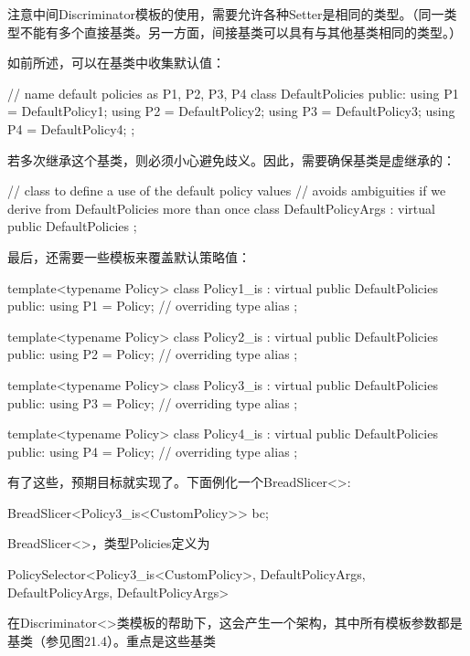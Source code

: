 注意中间Discriminator模板的使用，需要允许各种Setter是相同的类型。（同一类型不能有多个直接基类。另一方面，间接基类可以具有与其他基类相同的类型。）

如前所述，可以在基类中收集默认值：

\begin{cpp}
// name default policies as P1, P2, P3, P4
class DefaultPolicies {
	public:
	using P1 = DefaultPolicy1;
	using P2 = DefaultPolicy2;
	using P3 = DefaultPolicy3;
	using P4 = DefaultPolicy4;
};
\end{cpp}

若多次继承这个基类，则必须小心避免歧义。因此，需要确保基类是虚继承的：

\begin{cpp}
// class to define a use of the default policy values
// avoids ambiguities if we derive from DefaultPolicies more than once
class DefaultPolicyArgs : virtual public DefaultPolicies {};
\end{cpp}

最后，还需要一些模板来覆盖默认策略值：

\begin{cpp}
template<typename Policy>
class Policy1_is : virtual public DefaultPolicies {
	public:
	using P1 = Policy; // overriding type alias
};

template<typename Policy>
class Policy2_is : virtual public DefaultPolicies {
	public:
	using P2 = Policy; // overriding type alias
};

template<typename Policy>
class Policy3_is : virtual public DefaultPolicies {
	public:
	using P3 = Policy; // overriding type alias
};

template<typename Policy>
class Policy4_is : virtual public DefaultPolicies {
	public:
	using P4 = Policy; // overriding type alias
};
\end{cpp}

有了这些，预期目标就实现了。下面例化一个BreadSlicer<>:

\begin{cpp}
BreadSlicer<Policy3_is<CustomPolicy>> bc;
\end{cpp}

BreadSlicer<>，类型Policies定义为

\begin{cpp}
PolicySelector<Policy3_is<CustomPolicy>,
				DefaultPolicyArgs,
				DefaultPolicyArgs,
				DefaultPolicyArgs>
\end{cpp}

在Discriminator<>类模板的帮助下，这会产生一个架构，其中所有模板参数都是基类（参见图21.4）。重点是这些基类

